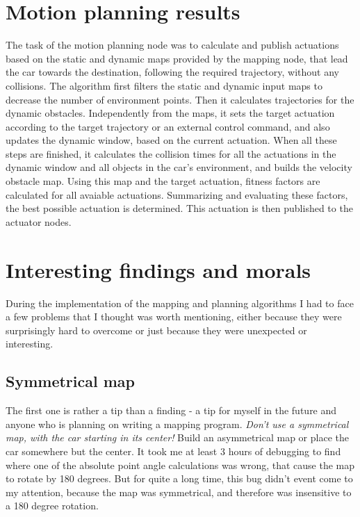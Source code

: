 \section{Motion planning results}
The task of the motion planning node was to calculate and publish actuations based on the static and dynamic maps provided by the mapping node, that lead the car towards the destination, following the required trajectory, without any collisions. The algorithm first filters the static and dynamic input maps to decrease the number of environment points. Then it calculates trajectories for the dynamic obstacles. Independently from the maps, it sets the target actuation according to the target trajectory or an external control command, and also updates the dynamic window, based on the current actuation. When all these steps are finished, it calculates the collision times for all the actuations in the dynamic window and all objects in the car's environment, and builds the velocity obstacle map. Using this map and the target actuation, fitness factors are calculated for all avaiable actuations. Summarizing and evaluating these factors, the best possible actuation is determined. This actuation is then published to the actuator nodes.

\section{Interesting findings and morals}
During the implementation of the mapping and planning algorithms I had to face a few problems that I thought was worth mentioning, either because they were surprisingly hard to overcome or just because they were unexpected or interesting.

\subsection{Symmetrical map}
The first one is rather a tip than a finding - a tip for myself in the future and anyone who is planning on writing a mapping program. \textit{Don't use a symmetrical map, with the car starting in its center!} Build an asymmetrical map or place the car somewhere but the center. It took me at least 3 hours of debugging to find where one of the absolute point angle calculations was wrong, that cause the  map to rotate by 180 degrees. But for quite a long time, this bug didn't event come to my attention, because the map was symmetrical, and therefore was insensitive to a 180 degree rotation.

